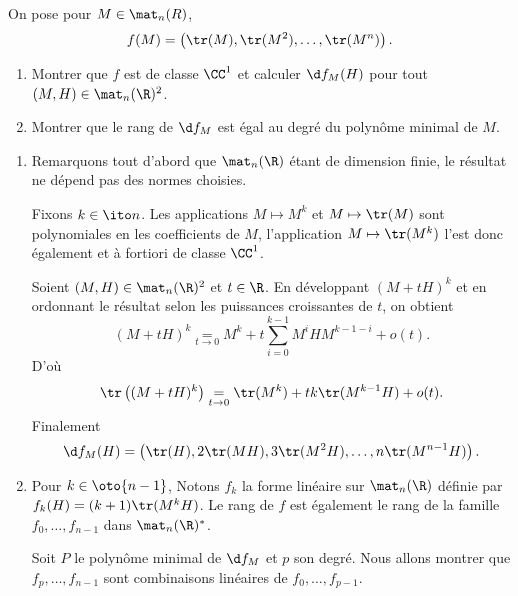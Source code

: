 \begin{enonce}
\begin{exercise}[ID={RMS 121/2 E585, Mines-Ponts PSI},subtitle={},tags={}, difficulty={0}]
On pose pour $M\in\mat_n(R)$,
\begin{equation*}
    f(M)=\left( \tr(M),\tr(M^2),\dotsc,\tr(M^n)\right).
\end{equation*}
\begin{enumerate}
    \item Montrer que $f$ est de classe $\CC^1$ et calculer $\d f_M(H)$ pour tout $(M,H)\in\mat_n(\R)^2$.
    \item Montrer que le rang de $\d f_M$ est égal au degré du polynôme minimal de $M$.
\end{enumerate}
\end{exercise}
\begin{solution}
\begin{enumerate}
    \item Remarquons tout d'abord que $\mat_n(\R)$ étant de dimension finie, le résultat ne dépend pas des normes choisies.

Fixons $k\in\ito n$.
Les applications $M\mapsto M^k$ et $M\mapsto \tr(M)$ sont polynomiales en les coefficients de $M$, l'application $M\mapsto\tr(M^k)$ l'est donc également et à fortiori de classe $\CC^1$.

Soient $(M,H)\in\mat_n(\R)^2$ et $t\in\R$. En développant $(M+tH)^k$ et en ordonnant le résultat selon les puissances croissantes de $t$, on obtient
\begin{equation*}
    (M+tH)^k \underset{t\to0}= M^k + t \sum_{i=0}^{k-1} M^iH M^{k-1-i} + o(t).
\end{equation*}
D'où
\begin{equation*}
    \tr\left((M+tH)^k\right) \underset{t\to0}= \tr(M^k) + t k\tr(M^{k-1}H) + o(t).
\end{equation*}
Finalement
\begin{equation*}
    \d f_M(H) = \left( \tr(H),2\tr(MH),3\tr(M^2H),\dotsc, n\tr(M^{n-1}H)\right).
\end{equation*}



\item
    Pour $k\in\oto{n-1}$, Notons $f_k$ la forme linéaire sur $\mat_n(\R)$ définie par $f_k(H)= (k+1)\tr(M^k H)$. Le rang de $f$ est également le rang de la famille $f_0,\dotsc, f_{n-1}$ dans $\mat_n(\R)^*$.

Soit $P$ le polynôme minimal de $\d f_M$ et $p$ son degré.
Nous allons montrer que $f_{p},\dotsc,f_{n-1}$ sont combinaisons linéaires de $f_0,\dotsc,f_{p-1}$.


\end{enumerate}
\end{solution}
\end{enonce}
